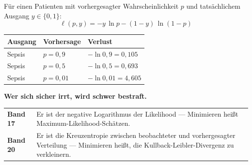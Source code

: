\begin{merksatz}
Für einen Patienten mit vorhergesagter Wahrscheinlichkeit $p$ und tatsächlichem Ausgang $y \in \{0,1\}$:
\[ \ell(p,y) = -y\,\ln p - (1-y)\,\ln(1-p) \]

\begin{center}
{\small
\renewcommand{\arraystretch}{1.5}
\begin{tabular}{@{}P{2.4cm}P{2.4cm}P{3.0cm}@{}}
\toprule
\textbf{Ausgang} & \textbf{Vorhersage} & \textbf{Verlust}\\
\midrule
Sepsis & $p = 0{,}9$ & $-\ln0{,}9 = 0{,}105$\\
Sepsis & $p = 0{,}5$ & $-\ln0{,}5 = 0{,}693$\\
Sepsis & $p = 0{,}01$ & $-\ln0{,}01 = 4{,}605$\\
\bottomrule
\end{tabular}}
\end{center}

\begin{center}
\begin{minipage}{0.9\textwidth}
\textbf{Wer sich sicher irrt, wird schwer bestraft.}
\end{minipage}
\end{center}

\begin{center}
{\small
\renewcommand{\arraystretch}{1.5}
\begin{tabular}{@{}P{2.4cm}P{6.2cm}@{}}
\toprule
\textbf{Band 17} & Er ist der negative Logarithmus der Likelihood --- Minimieren heißt Maximum-Likelihood-Schätzen.\\
\textbf{Band 20} & Er ist die Kreuzentropie zwischen beobachteter und vorhergesagter Verteilung --- Minimieren heißt, die Kullback-Leibler-Divergenz zu verkleinern.\\
\bottomrule
\end{tabular}}
\end{center}

\begin{center}
\begin{minipage}{0.88\textwidth}
\end{minipage}
\end{center}
\end{merksatz}

